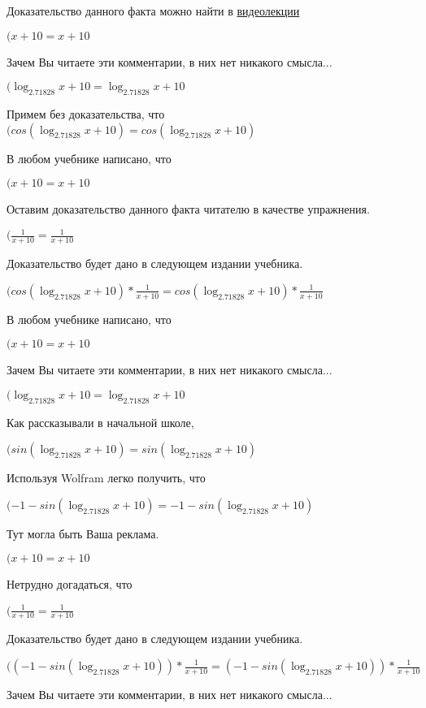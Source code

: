 \documentclass[12pt,a4paper,fleqn]{article}
\theoremstyle{definition}
\begin{document}
Доказательство данного факта можно найти в \href{https://www.youtube.com/watch?v=dQw4w9WgXcQ}{видеолекции}

$( x  +  10  =  x  +  10 $

Зачем Вы читаете эти комментарии, в них нет никакого смысла...

$(\log_{ 2.71828 }{ x  +  10 } = \log_{ 2.71828 }{ x  +  10 }$

Примем без доказательства, что
$(cos(\log_{ 2.71828 }{ x  +  10 }) = cos(\log_{ 2.71828 }{ x  +  10 })$

В любом учебнике написано, что

$( x  +  10  =  x  +  10 $

Оставим доказательство данного факта читателю в качестве упражнения.

$(\frac{ 1 }{ x  +  10 }
 = \frac{ 1 }{ x  +  10 }
$

Доказательство будет дано в следующем издании учебника.

$(cos(\log_{ 2.71828 }{ x  +  10 }) * \frac{ 1 }{ x  +  10 }
 = cos(\log_{ 2.71828 }{ x  +  10 }) * \frac{ 1 }{ x  +  10 }
$

В любом учебнике написано, что

$( x  +  10  =  x  +  10 $

Зачем Вы читаете эти комментарии, в них нет никакого смысла...

$(\log_{ 2.71828 }{ x  +  10 } = \log_{ 2.71828 }{ x  +  10 }$

Как рассказывали в начальной школе,

$(sin(\log_{ 2.71828 }{ x  +  10 }) = sin(\log_{ 2.71828 }{ x  +  10 })$

Используя Wolfram легко получить, что

$( -1  - sin(\log_{ 2.71828 }{ x  +  10 }) =  -1  - sin(\log_{ 2.71828 }{ x  +  10 })$

Тут могла быть Ваша реклама.

$( x  +  10  =  x  +  10 $

Нетрудно догадаться, что

$(\frac{ 1 }{ x  +  10 }
 = \frac{ 1 }{ x  +  10 }
$

Доказательство будет дано в следующем издании учебника.

$(( -1  - sin(\log_{ 2.71828 }{ x  +  10 })) * \frac{ 1 }{ x  +  10 }
 = ( -1  - sin(\log_{ 2.71828 }{ x  +  10 })) * \frac{ 1 }{ x  +  10 }
$

Зачем Вы читаете эти комментарии, в них нет никакого смысла...
\end{document}

